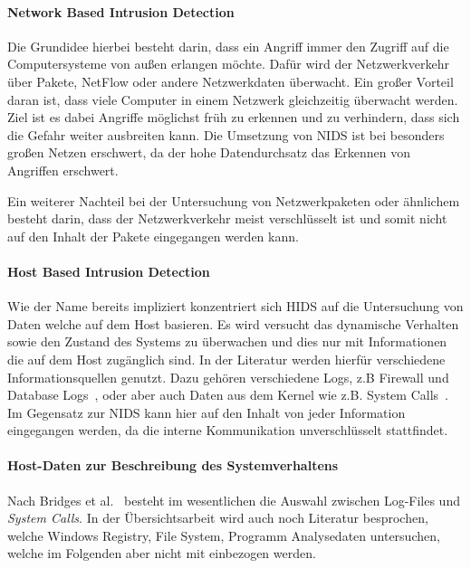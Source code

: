             \paragraph{Network Based Intrusion Detection}
                Die Grundidee hierbei besteht darin, dass ein Angriff immer den Zugriff auf die Computersysteme von außen erlangen möchte.
                Dafür wird der Netzwerkverkehr über Pakete, NetFlow oder andere Netzwerkdaten überwacht.
                Ein großer Vorteil daran ist, dass viele Computer in einem Netzwerk gleichzeitig überwacht werden.
                Ziel ist es dabei Angriffe möglichst früh zu erkennen und zu verhindern, dass sich die Gefahr weiter ausbreiten kann.
                Die Umsetzung von \ac{NIDS} ist bei besonders großen Netzen erschwert, da der hohe Datendurchsatz das Erkennen von Angriffen erschwert.~\cite{NIDS}

                Ein weiterer Nachteil bei der Untersuchung von Netzwerkpaketen oder ähnlichem besteht darin, dass der Netzwerkverkehr meist verschlüsselt ist und somit nicht auf den Inhalt der Pakete eingegangen werden kann.

            \paragraph{Host Based Intrusion Detection}
                Wie der Name bereits impliziert konzentriert sich \ac{HIDS} auf die Untersuchung von Daten welche auf dem Host basieren.
                Es wird versucht das dynamische Verhalten sowie den Zustand des Systems zu überwachen und dies nur mit Informationen die auf dem Host zugänglich sind.
                In der Literatur werden hierfür verschiedene Informationsquellen genutzt.
                Dazu gehören verschiedene Logs, z.B Firewall und Database Logs~\cite{IDSsurvey},
                oder aber auch Daten aus dem Kernel wie z.B. System Calls~\cite{MAGGI}.
                Im Gegensatz zur \ac{NIDS} kann hier auf den Inhalt von jeder Information eingegangen werden, da die interne Kommunikation unverschlüsselt stattfindet.~\cite{OSSECBRAY2008}

            \paragraph{Host-Daten zur Beschreibung des Systemverhaltens}
                 
                Nach Bridges et al.~\cite{HIDSSURVEY2019bridges} besteht im wesentlichen die Auswahl zwischen Log-Files und \textit{System Calls}.
                In der Übersichtsarbeit wird auch noch Literatur besprochen, welche Windows Registry, File System, Programm Analysedaten untersuchen, welche im Folgenden aber nicht mit einbezogen werden.

